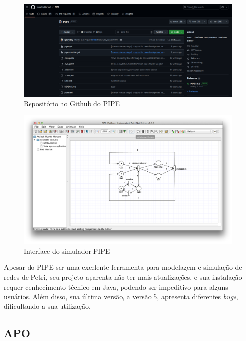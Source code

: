 \documentclass[
	12pt,				%
	openright,			%
	oneside,			%
	a4paper,			%
	english,			%
	brazil				%
	]{abntex2}
\begin{document}
\begin{figure}[ht] 
	\centering
	\includegraphics[scale=0.30]{figuras/pipeRepo.png}
	\caption[Repositório no Github do PIPE]{Repositório no Github do PIPE}
	\label{fig:pipeRepo}
\end{figure}
\FloatBarrier

\begin{figure}[ht] 
	\centering
	\includegraphics[scale=0.30]{figuras/pipe.png}
	\caption[Interface do simulador PIPE]{Interface do simulador PIPE}
	\label{fig:interfacePipe}
\end{figure}
\FloatBarrier

Apesar do PIPE ser uma excelente ferramenta para modelagem e simulação de redes de Petri, seu projeto aparenta não ter mais atualizações, e sua instalação requer conhecimento técnico em Java, podendo ser impeditivo para alguns usuários. Além disso, sua última versão, a versão 5, apresenta diferentes \textit{bugs}, dificultando a sua utilização. 

\subsection*{APO}
\end{document}
